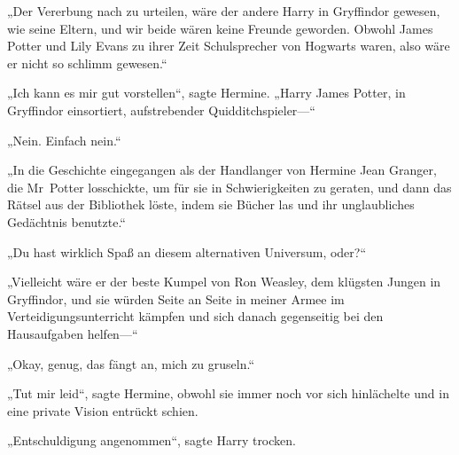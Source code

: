 „Der Vererbung nach zu urteilen, wäre der andere Harry in Gryffindor gewesen, wie seine Eltern, und wir beide wären keine Freunde geworden. Obwohl James Potter und Lily Evans zu ihrer Zeit Schulsprecher von Hogwarts waren, also wäre er nicht so schlimm gewesen.“

„Ich kann es mir gut vorstellen“, sagte Hermine. „Harry James Potter, in Gryffindor einsortiert, aufstrebender Quidditchspieler—“

„Nein. Einfach nein.“

„In die Geschichte eingegangen als der Handlanger von Hermine Jean Granger, die Mr~Potter losschickte, um für sie in Schwierigkeiten zu geraten, und dann das Rätsel aus der Bibliothek löste, indem sie Bücher las und ihr unglaubliches Gedächtnis benutzte.“

„Du hast wirklich Spaß an diesem alternativen Universum, oder?“

„Vielleicht wäre er der beste Kumpel von Ron Weasley, dem klügsten Jungen in Gryffindor, und sie würden Seite an Seite in meiner Armee im Verteidigungsunterricht kämpfen und sich danach gegenseitig bei den Hausaufgaben helfen—“

„Okay, genug, das fängt an, mich zu gruseln.“

„Tut mir leid“, sagte Hermine, obwohl sie immer noch vor sich hinlächelte und in eine private Vision entrückt schien.

„Entschuldigung angenommen“, sagte Harry trocken.


